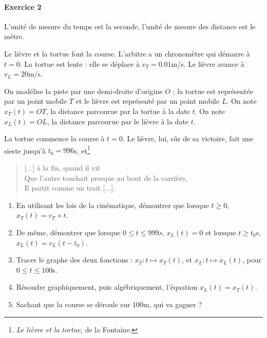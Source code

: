 			\paragraph{Exercice 2}
			L'unité de mesure du temps est la seconde, l'unité de mesure des distance est le mètre.

			Le lièvre et la tortue font la course. L'arbitre a un chronomètre qui démarre à $t=0$. La tortue est lente : elle se déplace à $v_T=0.01$m/s. Le lièvre avance à $v_L=20$m/s. 

			On modélise la piste par une demi-droite d'origine $O$ ; la tortue est représentée par un point mobile $T$ et le lièvre est représenté par un point mobile $L$. On note $x_T(t)=OT$, la distance parcourue par la tortue à la date $t$. On note $x_L(t)=OL$, la distance parcourue par le lièvre à la date $t$. 

			La tortue commence la course à $t=0$. Le lièvre, lui, sûr de sa victoire, fait une sieste jusqu'à $t_0=996$s, et\footnote{\emph{Le lièvre et la tortue}, de la Fontaine.}
			\begin{quote}
				[...] à la fin, quand il  vit \\
			  Que l'autre touchait presque au bout de la carrière, \\
			  Il partit comme un trait [...].
			\end{quote}

			\begin{enumerate}
				\item En utilisant les lois de la cinématique, démontrer que lorsque $t\ge0$, $x_T(t)=v_T\times t$.
				\item De même, démontrer que lorsque $0\le t\le 999s$, $x_L(t)=0$ et lorsque $t\ge t_0$s, $x_L(t)=v_L(t-t_0)$.
				\item Tracer le graphe des deux fonctions : $x_T: t\mapsto x_T(t)$, et $x_L:t\mapsto x_L(t)$, pour $0\le t\le 100$s.
				\item Résoudre graphiquement, puis algébriquement, l'équation $x_L(t)=x_T(t)$.
				\item Sachant que la course se déroule sur 100m, qui va gagner ?
			\end{enumerate}







